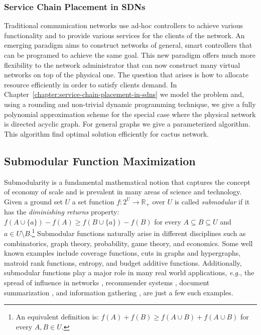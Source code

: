 \subsubsection*{Service Chain Placement in SDNs} 
Traditional communication networks use ad-hoc controllers to achieve various functionality and to provide various services for the clients of the network.
An emerging paradigm aims to construct networks of general, smart controllers that can be programed to achieve the same goal. 
This new paradigm offers much more flexibility to the network administrator that can now construct many virtual networks on top of the physical one.
The question that arises is how to allocate resource efficiently in order to satisfy clients demand.
In Chapter~\ref{chapter:service-chain-placement-in-sdns} we model the problem and, using a rounding and non-trivial dynamic programming technique, we give a fully polynomial approximation scheme for the special case where the physical network is directed acyclic graph. 
For general graphs we give a parameterized algorithm.
This algorithm find optimal solution efficiently for cactus network.

\subsection*{Submodular Function Maximization}
Submodularity is a fundamental mathematical notion that captures the concept of economy of scale and is prevalent in many areas of science and technology.
Given a ground set $U$ a set function $f:2^U \to \mathbb{R}_+$ over $U$ is called \emph{submodular} if it has the \emph{diminishing returns} property:
$f(A \cup \{a\}) - f(A) \geq f(B \cup \{a\}) - f(B)$ for every $A \subseteq B \subseteq U$ and $a \in U \setminus B$.\footnote{
    An equivalent definition is: $f(A) + f(B) \geq f(A \cup B) + f(A \cup B)$ for every $A,B \in U$.
}
Submodular functions naturally arise in different disciplines such as combinatorics, graph theory, probability, game theory, and economics.
Some well known examples include coverage functions, cuts in graphs and hypergraphs, matroid rank functions, entropy, and budget additive functions.
Additionally, submodular functions play a major role in many real world applications, {\em e.g.}, the spread of influence in networks \cite{KKT03,KKT05,KKT15,MR10}, recommender systems \cite{EG11,EVSG09}, document summarization \cite{DKR13,LB10,LB11}, and information gathering \cite{GKS05,KG11,KGGK06,KGGK11,KSG08}, are just a few such examples.

